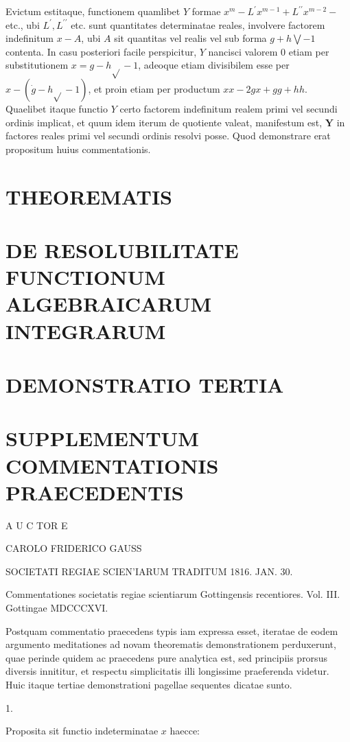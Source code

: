 \documentclass[twoside,12pt, showframe]{memoir}
\begin{document}
Evictum estitaque, functionem quamlibet \(Y\) formae \(x^{m}-L^{\prime} x^{m-1}+L^{\prime \prime} x^{m-2}-\) etc., ubi \(L^{\prime}, L^{\prime \prime}\) etc. sunt quantitates determinatae reales, involvere factorem indefinitum \(x-A\), ubi \(A\) sit quantitas vel realis vel sub forma \(g+h \bigvee-1\) contenta. In casu posteriori facile perspicitur, \(Y\) nancisci valorem 0 etiam per substitutionem \(x=g-h \sqrt{ }-1\), adeoque etiam divisibilem esse per \(x-(\dot{g}-h \sqrt{ }-1)\), et proin etiam per productum \(x x-2 g x+g g+h h\). Quaelibet itaque functio \(Y\) certo factorem indefinitum realem primi vel secundi ordinis implicat, et quum idem iterum de quotiente valeat, manifestum est, \(\boldsymbol{Y}\) in factores reales primi vel secundi ordinis resolvi posse. Quod demonstrare erat propositum huius commentationis.

\section*{THEOREMATIS }
\section*{DE RESOLUBILITATE FUNCTIONUM ALGEBRAICARUM INTEGRARUM}


\section*{DEMONSTRATIO TERTIA}
\section*{SUPPLEMENTUM COMMENTATIONIS PRAECEDENTIS}
A U C TOR E

CAROLO FRIDERICO GAUSS

SOCIETATI REGIAE SCIEN'IARUM TRADITUM 1816. JAN. 30.

Commentationes societatis regiae scientiarum Gottingensis recentiores. Vol. III. Gottingae MDCCCXVI.

Postquam commentatio praecedens typis iam expressa esset, iteratae de eodem argumento meditationes ad novam theorematis demonstrationem perduxerunt, quae perinde quidem ac praecedens pure analytica est, sed principiis prorsus diversis innititur, et respectu simplicitatis illi longissime praeferenda videtur. Huic itaque tertiae demonstrationi pagellae sequentes dicatae sunto.

1.

Proposita sit functio indeterminatae \(x\) haecce:
\end{document}

